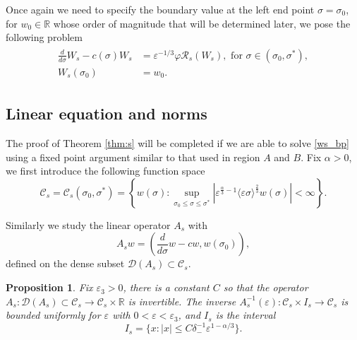 \documentclass[letterpaper,11pt]{article}
\newcommand{\eps}{\varepsilon}
\newcommand{\Ral}{\mathcal{R}}
\numberwithin{equation}{section}
\theoremstyle{plain}
\newtheorem{Proposition}[Lemma]{Proposition}
\begin{document}
Once again we need to specify the boundary value at the left end point $\sigma = \sigma_0$, for $w_0 \in \mathbb{R}$ whose order of magnitude that will be determined later, we pose the following problem
\begin{align}\label{ws_bp}
\begin{split}
\frac{d}{d\sigma} W_s - c(\sigma)W_s &= \eps^{-1/3}\varphi \Ral_s(W_s), \text{ for }\sigma \in (\sigma_0,\sigma^*),\\
W_s(\sigma_0) &= w_0.
\end{split}
\end{align}





\subsection{Linear equation and norms}
The proof of Theorem \ref{thm:s} will be completed if we are able to solve \eqref{ws_bp} using a fixed point argument similar to that used in region $A$ and $B$. Fix $\alpha>0$, we first introduce the following function space
\[
\mathcal{C}_s= \mathcal{C}_s(\sigma_0, \sigma^*)  = \left\{ w(\sigma) : \sup_{\sigma_0 \le \sigma \le \sigma^*} |\eps^{\frac{\alpha}{3} -1 }\langle \eps\sigma \rangle^{\frac{2}{3}} w(\sigma)|<\infty \right\}.
\]

Similarly we study the linear operator $A_s$ with \[
A_s w = \left(\frac{d}{d\sigma}w - cw, w(\sigma_0)\right),
\]
defined on the dense subset $\mathcal{D}(A_s) \subset \mathcal{C}_s$.


\begin{Proposition}\label{inv_A_s}Fix $\eps_3 >0$, there is a constant $C$ so that
the operator $A_s : \mathcal{D}(A_s)\subset \mathcal{C}_s \to \mathcal{C}_s\times \mathbb{R}$ is invertible. The inverse $A_s^{-1}(\eps) : \mathcal{C}_s \times I_s \to \mathcal{C}_s$ is bounded uniformly for $\eps$ with $0<\eps<\eps_3$, and $I_s$ is the interval
\[
I_s =\{x : |x|\le C\delta^{-1}_-\eps^{1-\alpha/3}\}.
\]
\end{Proposition}
\end{document}
